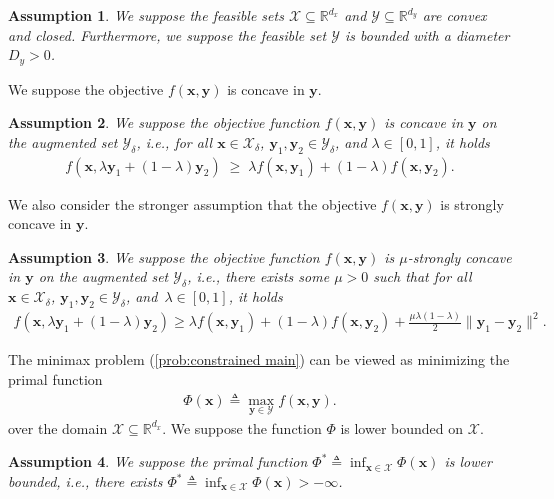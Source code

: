 \documentclass[11pt]{article}
\def\vx{\mathbf{x}}
\def\vy{\mathbf{y}}
\def\fX{{\mathcal{X}}}
\def\fY{{\mathcal{Y}}}
\def\BR{{\mathbb{R}}}
\newtheorem{assumption}{Assumption}
\begin{document}
\begin{assumption}\label{asm:convex-closed}
    We suppose the feasible sets $\fX\subseteq\BR^{d_x}$ and $\fY\subseteq\BR^{d_y}$ are convex and closed.
    Furthermore, we suppose the feasible set $\fY$ is bounded with a diameter $D_y>0$.
\end{assumption}
We suppose the objective $f(\vx,\vy)$ is concave in $\vy$.
\begin{assumption}\label{asm:concave}
    We suppose the objective function $f(\vx,\vy)$ is concave in $\vy$ on the augmented set $\fY_\delta$, i.e., 
    for all $\vx \in \fX_\delta$, $\vy_1,\vy_2 \in \fY_\delta$, and  $\lambda\in[0,1]$, it holds 
    \begin{align*}        
        f(\vx, \lambda \vy_1 + (1-\lambda)\vy_2)
        \;\ge\;
        \lambda f(\vx, \vy_1) + (1-\lambda) f(\vx, \vy_2).
    \end{align*}
\end{assumption}
We also consider the stronger assumption that the objective $f(\vx,\vy)$ is strongly concave in $\vy$.
\begin{assumption}\label{asm:strongly-concave}
    We suppose the objective function $f(\vx,\vy)$ is $\mu$-strongly concave in $\vy$ on the augmented set $\fY_\delta$, i.e., there exists some $\mu>0$ such that for all $\vx \in \fX_\delta$, $\vy_1,\vy_2 \in \fY_\delta$, and~$\lambda\in[0,1]$,  it holds 
    \begin{align*}
        f(\vx,\lambda \vy_1 + (1-\lambda)\vy_2)
        \ge
        \lambda f(\vx,\vy_1) + (1-\lambda)f(\vx,\vy_2)
        +
        \frac{\mu\lambda(1-\lambda)}{2}\|\vy_1 - \vy_2\|^2.
    \end{align*}
\end{assumption}
The minimax problem (\ref{prob:constrained main}) can be viewed as minimizing the primal function
\begin{align}\label{def: Phi}
 \Phi(\vx) \triangleq \max_{\vy \in \mathcal{Y}} f(\vx, \vy).   
\end{align}
over the domain $\fX\subseteq\BR^{d_x}$. We suppose the function $\Phi$ is lower bounded on $\fX$.


\begin{assumption}\label{asm:lower-bound}
    We suppose the primal function $\Phi^*\triangleq\inf_{\vx\in\mathcal{X}}\Phi(\vx)$ is lower bounded, i.e., there exists $\Phi^*\triangleq\inf_{\vx\in\mathcal{X}}\Phi(\vx)>-\infty$.
\end{assumption}
\end{document}
